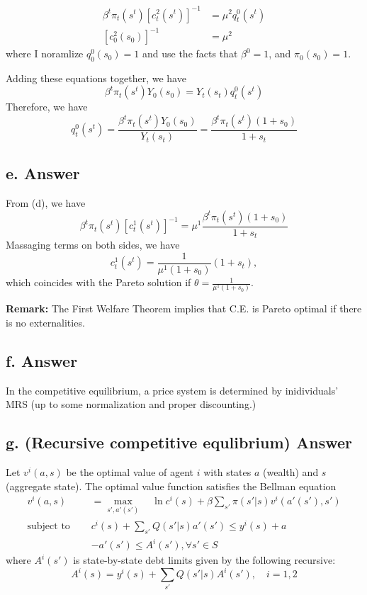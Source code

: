 \documentclass[11pt]{article}
\theoremstyle{definition}
\theoremstyle{boldtitle} %
\numberwithin{equation}{section}
\numberwithin{figure}{section}
\numberwithin{table}{section}
\begin{document}
\begin{align*}
    \beta^t \pi_t(s^t) [c_t^2(s^t)]^{-1} &= \mu^2 q_t^0(s^t) \\
    [c_0^2(s_0)]^{-1} &= \mu^2
\end{align*}
where I noramlize $q_0^0(s_0) = 1$ and use the facts that $\beta^0 =1$, and $\pi_0(s_0)=1$. 

Adding these equations together, we have 
\[
\beta^t \pi_t(s^t)Y_0(s_0) = Y_t(s_t) q_t^0(s^t)
\]
Therefore, we have
\[
q_t^0(s^t) = \frac{\beta^t \pi_t(s^t)Y_0(s_0)}{Y_t(s_t) } = \frac{\beta^t \pi_t(s^t)(1+s_0)}{1 + s_t} 
\]


\subsection{e. Answer} 
From (d), we have 
\[
\beta^t \pi_t(s^t) [c_t^1(s^t)]^{-1} = \mu^1 \frac{\beta^t \pi_t(s^t)(1+s_0)}{1 + s_t} 
\]
Massaging terms on both sides, we have 
\[
c_t^1(s^t) = \frac{1}{\mu^1 (1 + s_0)} (1 + s_t),
\]
which coincides with the Pareto solution if $\theta = \frac{1}{\mu^1 (1 + s_0)}$.

\noindent \textbf{Remark:} The First Welfare Theorem implies that C.E. is Pareto optimal if there is no externalities.


\subsection{f. Answer} 
In the competitive equilibrium, a price system is determined by inidividuals' MRS (up to some normalization and proper discounting.)


\subsection{g. (Recursive competitive equlibrium) Answer} 
Let $v^i(a,s)$ be the optimal value of agent $i$ with states $a$ (wealth) and $s$ (aggregate state).
The optimal value function satisfies the Bellman equation
\begin{align*}
v^i(a, s) & = \max_{s',a'(s')}\quad \ln c^i(s) + \beta \sum_{s'} \pi(s'|s) v^i(a'(s'),s') \\
\text{subject to } \quad & c^i(s) + \sum_{s'} Q(s'|s) a'(s') \leq y^i(s) + a \\ 
& -a'(s') \leq A^i (s'), \forall s' \in S
\end{align*}
where $A^i(s')$ is state-by-state debt limits given by the following recursive:
\[
A^i(s) = y^i(s) + \sum_{s'} Q(s'|s)  A^i(s'), \quad i = 1, 2
\]
\end{document}
